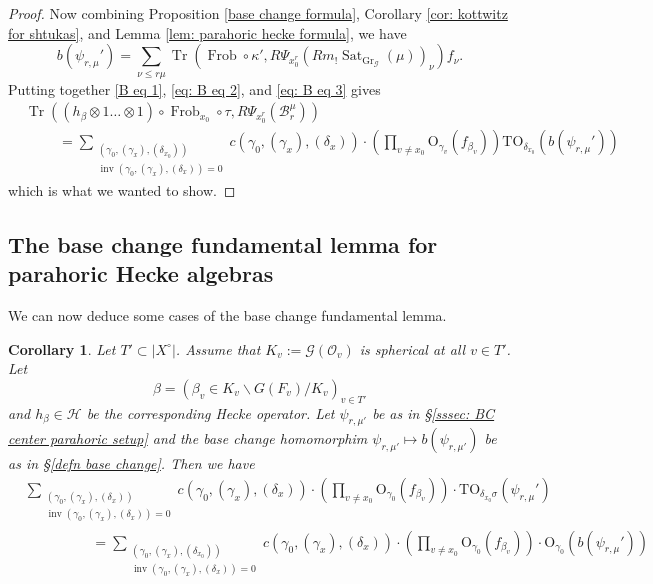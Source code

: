 \documentclass[reqno]{amsart}
\numberwithin{equation}{section}
\newcommand{\Cal}[1]{\mathcal{#1}}
\newcommand{\mrm}[1]{\mathrm{#1}}
\newcommand{\cX}{X^{\circ}}
\DeclareMathOperator{\Frob}{Frob}
\DeclareMathOperator{\Tr}{Tr}
\DeclareMathOperator{\Gr}{Gr}
\DeclareMathOperator{\inv}{inv}
\DeclareMathOperator{\Sat}{Sat}
\newtheorem{cor}[thm]{Corollary}
\theoremstyle{remark}
\numberwithin{equation}{section}
\begin{document}
\begin{proof}
Now combining Proposition \ref{base change formula}, Corollary \ref{cor: kottwitz for shtukas}, and Lemma \ref{lem: parahoric hecke formula}, we have 
\begin{equation}\label{eq: B eq 3}
b(\psi_{r,\mu}') = \sum_{\nu \leq r\mu} \Tr( \Frob \circ  \kappa', R \Psi_{ x_0^r} (Rm_!\Sat_{\Gr_{\Cal{G}}}(\mu))_{\nu})  f_{\nu} .
\end{equation}
Putting together \eqref{B eq 1}, \eqref{eq: B eq 2}, and \eqref{eq: B eq 3} gives
\begin{align*}
&\Tr(( h_{\beta} \otimes 1 \ldots \otimes 1 ) \circ \Frob_{x_0} \circ  \tau , R\Psi_{x_0^r}(\Cal{B}_r^{\mu}))  \\
& \hspace{1cm} =   \sum_{\substack{ (\gamma_0, (\gamma_x),(\delta_{x_0})) \\ \inv(\gamma_0, (\gamma_x),(\delta_x) ) = 0  }} 
c(\gamma_0, (\gamma_x), (\delta_x))   \cdot  \left( \prod_{v \neq x_0}\mrm{O}_{\gamma_v}(f_{\beta_v})   \right) \mrm{TO}_{\delta_{x_0}}(b(\psi_{r,\mu}'))
\end{align*}
which is what we wanted to show. 
\end{proof}

\subsection{The base change fundamental lemma for parahoric Hecke algebras}\label{FL proof}

We can now deduce some cases of the base change fundamental lemma. 

\begin{cor}\label{twisted and untwisted} Let $T' \subset |\cX|$. Assume that $K_v := \Cal{G}(\Cal{O}_v)$ is spherical at all $v \in T'$. Let 
\[
\beta = (\beta_v  \in K_v \backslash G(F_v) /  K_v)_{v \in T'}
\]
and $h_{\beta}  \in \Cal{H}$ be the corresponding Hecke operator. Let $\psi_{r,\mu'}$ be as in \S \ref{sssec: BC center parahoric setup} and the base change homomorphim $\psi_{r,\mu'} \mapsto b(\psi_{r,\mu'})$ be as in \S \ref{defn base change}. Then we have
\begin{align*}
&\sum_{\substack{ (\gamma_0, (\gamma_x),(\delta_x)) \\ \inv(\gamma_0, (\gamma_x),(\delta_x) ) = 0  }} 
c(\gamma_0, (\gamma_x), (\delta_x))   \cdot  \left(\prod_{v \neq x_0} \mrm{O}_{\gamma_0}(f_{\beta_v}) \right) \cdot   \mrm{TO}_{\delta_{x_0} \sigma}(\psi_{r,\mu}') \\
& \hspace{2cm} = 
 \sum_{\substack{ (\gamma_0, (\gamma_x),(\delta_{x_0})) \\ \inv(\gamma_0, (\gamma_x),(\delta_x) ) = 0  }} 
c(\gamma_0, (\gamma_x), (\delta_x))   \cdot  \left(\prod_{v \neq x_0} \mrm{O}_{\gamma_0}(f_{\beta_v})\right) \cdot  \mrm{O}_{\gamma_0}(b(\psi_{r,\mu}'))
\end{align*}
\end{cor}
\end{document}
